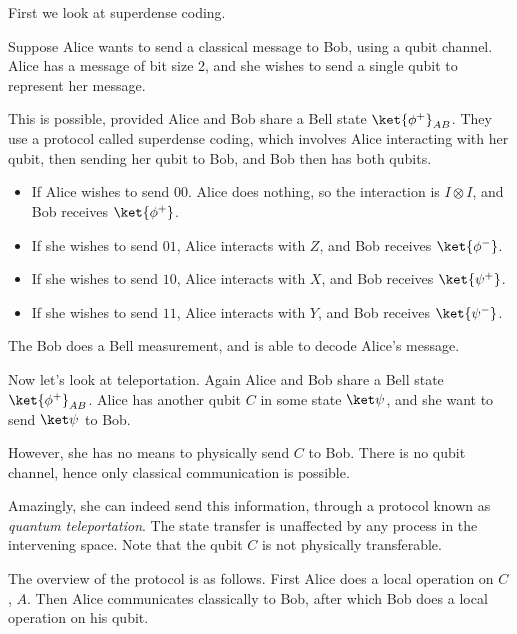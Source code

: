 \documentclass[12pt]{article}
\begin{document}
First we look at superdense coding.

Suppose Alice wants to send a classical message to Bob, using a qubit channel. Alice has a message of bit size 2, and she wishes to send a single qubit to represent her message.

This is possible, provided Alice and Bob share a Bell state $\ket{\phi^+}_{AB}$. They use a protocol called superdense coding, which involves Alice interacting with her qubit, then sending her qubit to Bob, and Bob then has both qubits.
\begin{itemize}
	\item If Alice wishes to send $00$. Alice does nothing, so the interaction is $I \otimes I$, and Bob receives $\ket{\phi^+}$.
	\item If she wishes to send $01$, Alice interacts with $Z$, and Bob receives $\ket{\phi^-}$.
	\item If she wishes to send $10$, Alice interacts with $X$, and Bob receives $\ket{\psi^+}$.
	\item If she wishes to send $11$, Alice interacts with $Y$, and Bob receives $\ket{\psi^-}$.
\end{itemize}

The Bob does a Bell measurement, and is able to decode Alice's message.

Now let's look at teleportation. Again Alice and Bob share a Bell state $\ket{\phi^+}_{AB}$. Alice has another qubit $C$ in some state $\ket \psi$, and she want to send $\ket \psi$ to Bob.

However, she has no means to physically send $C$ to Bob. There is no qubit channel, hence only classical communication is possible.

Amazingly, she can indeed send this information, through a protocol known as \emph{quantum teleportation}. The state transfer is unaffected by any process in the intervening space. Note that the qubit $C$ is not physically transferable.

The overview of the protocol is as follows. First Alice does a local operation on $C$, $A$. Then Alice communicates classically to Bob, after which Bob does a local operation on his qubit.
\end{document}
